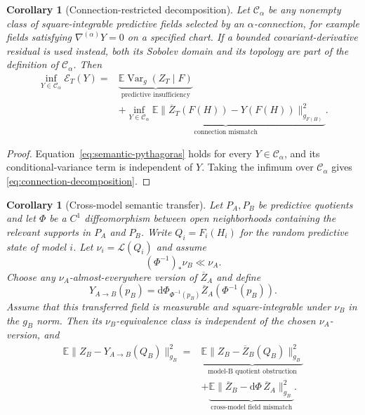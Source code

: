 \documentclass[11pt]{article}
\newtheorem{corollary}[theorem]{Corollary}
\theoremstyle{definition}
\theoremstyle{remark}
\newcommand{\E}{\mathbb{E}}
\newcommand{\Var}{\operatorname{Var}}
\newcommand{\dd}{\mathrm{d}}
\begin{document}
\begin{corollary}[Connection-restricted decomposition]\label{cor:connection-decomposition}
Let $\mathcal C_\alpha$ be any nonempty class of square-integrable predictive
fields selected by an $\alpha$-connection, for example fields satisfying
$\nabla^{(\alpha)}Y=0$ on a specified chart. If a bounded
covariant-derivative residual is used instead, both its Sobolev domain and its
topology are part of the definition of $\mathcal C_\alpha$. Then
\begin{equation}
\begin{split}
    \inf_{Y\in\mathcal C_\alpha}\mathcal E_T(Y)
    ={}&\underbrace{\E\Var_g(Z_T\mid F)}_{\text{predictive insufficiency}}\\
    &+\underbrace{\inf_{Y\in\mathcal C_\alpha}
    \E\|\overline Z_T(F(H))-Y(F(H))\|_{g_{F(H)}}^2}_{\text{connection mismatch}}.
\end{split}
\label{eq:connection-decomposition}
\end{equation}
\end{corollary}

\begin{proof}
Equation~\eqref{eq:semantic-pythagoras} holds for every $Y\in\mathcal C_\alpha$, and its conditional-variance term is independent of $Y$. Taking the infimum over $\mathcal C_\alpha$ gives \eqref{eq:connection-decomposition}.
\end{proof}

\begin{corollary}[Cross-model semantic transfer]\label{cor:cross-model-semantic}
Let $P_A,P_B$ be predictive quotients and let $\Phi$ be a $C^1$
diffeomorphism between open neighborhoods containing the relevant supports in
$P_A$ and $P_B$. Write $Q_i=F_i(H_i)$ for the random
predictive state of model $i$.
Let $\nu_i=\mathcal L(Q_i)$ and assume
\begin{equation}
    (\Phi^{-1})_*\nu_B\ll\nu_A.
    \label{eq:cross-model-domination}
\end{equation}
Choose any $\nu_A$-almost-everywhere version of $\overline Z_A$ and define
\begin{equation}
    Y_{A\to B}(p_B)=\dd\Phi_{\Phi^{-1}(p_B)}
    \overline Z_A(\Phi^{-1}(p_B)).
\end{equation}
Assume that this transferred field is measurable and square-integrable under
$\nu_B$ in the $g_B$ norm. Then its $\nu_B$-equivalence class is independent of
the chosen $\nu_A$-version, and
\begin{equation}
\begin{split}
    \E\|Z_B-Y_{A\to B}(Q_B)\|_{g_B}^2
    ={}&\underbrace{\E\|Z_B-\overline Z_B(Q_B)\|_{g_B}^2}_{\text{model-B quotient obstruction}}\\
    &+\underbrace{\E\|\overline Z_B-\dd\Phi\,\overline Z_A\|_{g_B}^2}_{\text{cross-model field mismatch}}.
\end{split}
\label{eq:cross-model-field-decomposition}
\end{equation}
\end{corollary}
\end{document}
